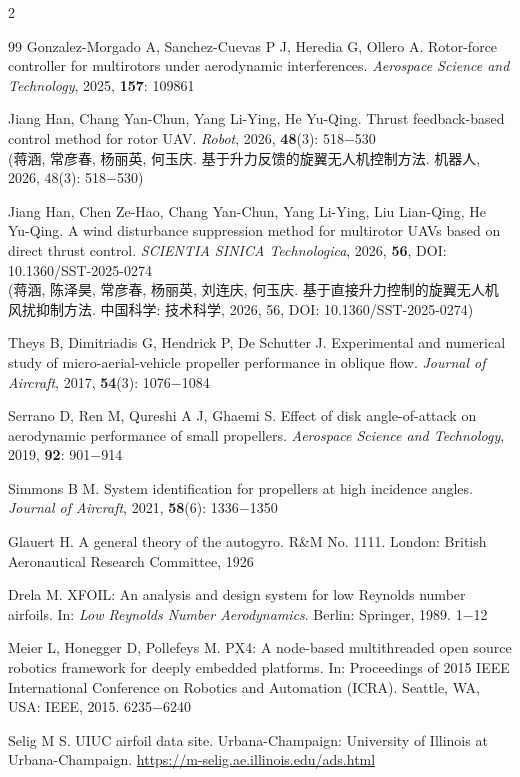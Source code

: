 \documentclass{aas}
\begin{document}
\begin{multicols}{2}
\begin{thebibliography}{99}
 Gonzalez-Morgado A, Sanchez-Cuevas P J, Heredia G, Ollero A. Rotor-force controller for multirotors under aerodynamic interferences. {\sl Aerospace Science and Technology}, 2025, {\bf 157}: 109861

 Jiang Han, Chang Yan-Chun, Yang Li-Ying, He Yu-Qing. Thrust feedback-based control method for rotor UAV. {\sl Robot}, 2026, {\bf 48}(3): 518$-$530 \\
(蒋涵, 常彦春, 杨丽英, 何玉庆. 基于升力反馈的旋翼无人机控制方法. 机器人, 2026, 48(3): 518$-$530)

 Jiang Han, Chen Ze-Hao, Chang Yan-Chun, Yang Li-Ying, Liu Lian-Qing, He Yu-Qing. A wind disturbance suppression method for multirotor UAVs based on direct thrust control. {\sl SCIENTIA SINICA Technologica}, 2026, {\bf 56}, DOI: 10.1360/SST-2025-0274 \\
(蒋涵, 陈泽昊, 常彦春, 杨丽英, 刘连庆, 何玉庆. 基于直接升力控制的旋翼无人机风扰抑制方法. 中国科学: 技术科学, 2026, 56, DOI: 10.1360/SST-2025-0274)

 Theys B, Dimitriadis G, Hendrick P, De Schutter J. Experimental and numerical study of micro-aerial-vehicle propeller performance in oblique flow. {\sl Journal of Aircraft}, 2017, {\bf 54}(3): 1076$-$1084

 Serrano D, Ren M, Qureshi A J, Ghaemi S. Effect of disk angle-of-attack on aerodynamic performance of small propellers. {\sl Aerospace Science and Technology}, 2019, {\bf 92}: 901$-$914

 Simmons B M. System identification for propellers at high incidence angles. {\sl Journal of Aircraft}, 2021, {\bf 58}(6): 1336$-$1350

 Glauert H. A general theory of the autogyro. R\&M No. 1111. London: British Aeronautical Research Committee, 1926

 Drela M. XFOIL: An analysis and design system for low Reynolds number airfoils. In: {\sl Low Reynolds Number Aerodynamics}. Berlin: Springer, 1989. 1$-$12

 Meier L, Honegger D, Pollefeys M. PX4: A node-based multithreaded open source robotics framework for deeply embedded platforms. In: Proceedings of 2015 IEEE International Conference on Robotics and Automation (ICRA). Seattle, WA, USA: IEEE, 2015. 6235$-$6240

 Selig M S. UIUC airfoil data site. Urbana-Champaign: University of Illinois at Urbana-Champaign. \url{https://m-selig.ae.illinois.edu/ads.html}


\end{thebibliography}
\end{multicols}
\end{document}
